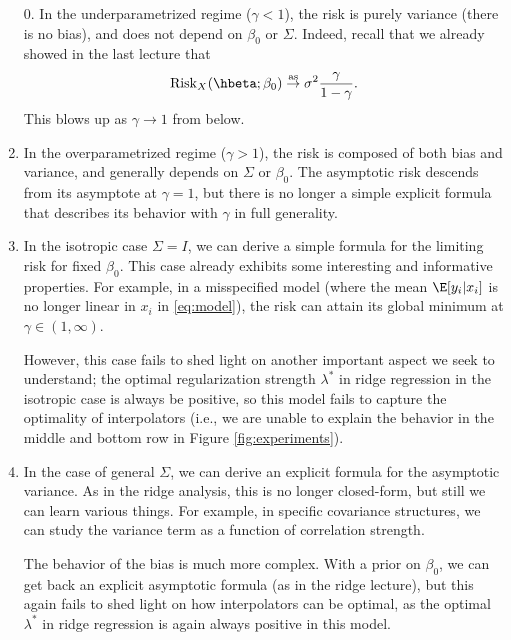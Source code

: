 \documentclass{article}
\begin{document}
\begin{enumerate}
\item[0.]
In the underparametrized regime ($\gamma < 1$), the risk is purely variance
(there is no bias), and does not depend on $\beta_0$ or $\Sigma$. Indeed, recall
that we already showed in the last lecture that
\begin{equation}
\label{eq:ls_risk_limit}
\Risk_X(\hbeta; \beta_0) \asto \sigma^2 \frac{\gamma}{1-\gamma}.
\end{equation}
This blows up as $\gamma \to 1$ from below. 

\item
In the overparametrized regime ($\gamma > 1$), the risk is composed of both
bias and variance, and generally depends on $\Sigma$ or $\beta_0$. The
asymptotic risk descends from its asymptote at $\gamma = 1$, but there is no
longer a simple explicit formula that describes its behavior with $\gamma$ in
full generality.

\item
In the isotropic case $\Sigma = I$, we can derive a simple formula for the
limiting risk for fixed $\beta_0$. This case already exhibits some interesting
and informative properties. For example, in a misspecified model (where the mean
$\E[y_i|x_i]$ is no longer linear in $x_i$ in \eqref{eq:model}), the risk can
attain its global minimum at $\gamma \in (1,\infty)$. 

However, this case fails to shed light on another important aspect we seek 
to understand; the optimal regularization strength $\lambda^*$ in ridge
regression in the isotropic case is always be positive, so this model fails to
capture the optimality of interpolators (i.e., we are unable to explain the 
behavior in the middle and bottom row in Figure \ref{fig:experiments}).

\item
In the case of general $\Sigma$, we can derive an explicit formula for the
asymptotic variance. As in the ridge analysis, this is no longer closed-form,
but still we can learn various things. For example, in specific covariance
structures, we can study the variance term as a function of correlation
strength.    

The behavior of the bias is much more complex. With a prior on $\beta_0$, we can 
get back an explicit asymptotic formula (as in the ridge lecture), but this
again fails to shed light on how interpolators can be optimal, as the optimal
$\lambda^*$ in ridge regression is again always positive in this model.        


\end{enumerate}
\end{document}
